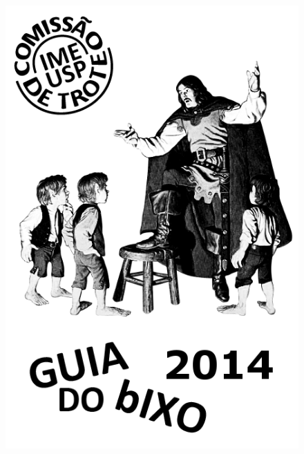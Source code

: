 \documentclass[12pt]{report}
\begin{document}
\begin{figure}[p]
  \begin{center}
    \includegraphics[height=0.9\textheight]{img/capa_2014.png} %
  \end{center}
\end{figure}
\thispagestyle{empty} %
\clearpage
\newpage


\pagebreak

\renewcommand{\contentsname}{\center Esse guia contém...}

\tableofcontents
\thispagestyle{empty}
\newpage
\end{document}
